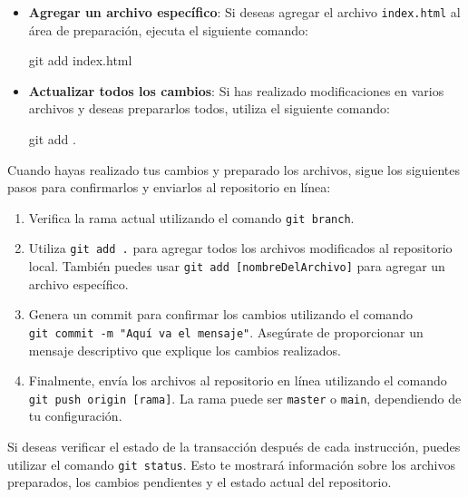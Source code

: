 \documentclass[
  a4paper,
]{article}
\newenvironment{Shaded}{}{}
\newcommand{\FunctionTok}[1]{\textcolor[rgb]{0.44,0.26,0.76}{#1}}
\newcommand{\NormalTok}[1]{\textcolor[rgb]{0.14,0.16,0.18}{#1}}
\providecommand{\tightlist}{%
  \setlength{\itemsep}{0pt}\setlength{\parskip}{0pt}}\usepackage{longtable,booktabs,array}
\begin{document}
\begin{itemize}
\item
  \textbf{Agregar un archivo específico}: Si deseas agregar el archivo
  \texttt{index.html} al área de preparación, ejecuta el siguiente
  comando:

\begin{Shaded}
\begin{Highlighting}[]
\FunctionTok{git}\NormalTok{ add index.html}
\end{Highlighting}
\end{Shaded}
\item
  \textbf{Actualizar todos los cambios}: Si has realizado modificaciones
  en varios archivos y deseas prepararlos todos, utiliza el siguiente
  comando:

\begin{Shaded}
\begin{Highlighting}[]
\FunctionTok{git}\NormalTok{ add .}
\end{Highlighting}
\end{Shaded}
\end{itemize}

Cuando hayas realizado tus cambios y preparado los archivos, sigue los
siguientes pasos para confirmarlos y enviarlos al repositorio en línea:

\begin{enumerate}
\def\labelenumi{\arabic{enumi}.}
\tightlist
\item
  Verifica la rama actual utilizando el comando \texttt{git\ branch}.
\item
  Utiliza \texttt{git\ add\ .} para agregar todos los archivos
  modificados al repositorio local. También puedes usar
  \texttt{git\ add\ {[}nombreDelArchivo{]}} para agregar un archivo
  específico.
\item
  Genera un commit para confirmar los cambios utilizando el comando
  \texttt{git\ commit\ -m\ "Aquí\ va\ el\ mensaje"}. Asegúrate de
  proporcionar un mensaje descriptivo que explique los cambios
  realizados.
\item
  Finalmente, envía los archivos al repositorio en línea utilizando el
  comando \texttt{git\ push\ origin\ {[}rama{]}}. La rama puede ser
  \texttt{master} o \texttt{main}, dependiendo de tu configuración.
\end{enumerate}

Si deseas verificar el estado de la transacción después de cada
instrucción, puedes utilizar el comando \texttt{git\ status}. Esto te
mostrará información sobre los archivos preparados, los cambios
pendientes y el estado actual del repositorio.
\end{document}
